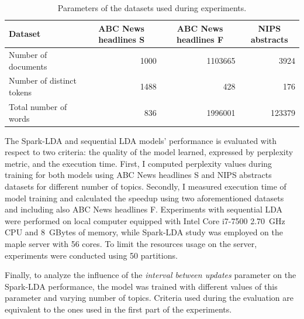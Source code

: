 \documentclass[journal]{IEEEtran}
\begin{document}
\renewcommand{\arraystretch}{1.2}
\begin{table}[t]
\centering
\caption{Parameters of the datasets used during experiments.}
\label{tab:datasets}
\begin{tabular}{lrrr} \toprule
Dataset                   & \multicolumn{1}{c}{ABC News headlines S} & \multicolumn{1}{c}{ABC News headlines F} & \multicolumn{1}{c}{NIPS abstracts} \\ \midrule
Number of documents       & 1000                                     & 1103665                                  & 3924                               \\
Number of distinct tokens & 1488                                      & 428                                      & 176                               \\
Total number of words     & 836                                      & 1996001                                  & 123379    \\ \bottomrule                        
\end{tabular}
\end{table}

The Spark-LDA and sequential LDA models' performance is evaluated with respect to two criteria: the quality of the model learned, expressed by perplexity metric\cite{blei2003latent}, and the execution time. First, I computed perplexity values during training for both models using ABC News headlines S and NIPS abstracts datasets for different number of topics. Secondly, I measured execution time of model training and calculated the speedup using two aforementioned datasets and including also ABC News headlines F. Experiments with sequential LDA were performed on local computer equipped with Intel Core i7-7500 2.70~GHz CPU and 8~GBytes of memory, while Spark-LDA study was employed on the maple server with 56 cores. To limit the resources usage on the server, experiments were conducted using 50 partitions.

Finally, to analyze the influence of the \textit{interval between updates} parameter on the Spark-LDA performance, the model was trained with different values of this parameter and varying number of topics. Criteria used during the evaluation are 
equivalent to the ones used in the first part of the experiments.
\end{document}
